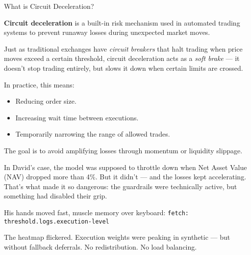 \begin{TechnicalSidebar}{What is Circuit Deceleration?}

  \textbf{Circuit deceleration} is a built-in risk mechanism used in automated trading systems to prevent runaway losses 
  during unexpected market moves.
  
  \medskip
  
  Just as traditional exchanges have \textit{circuit breakers} that halt trading when price moves exceed a certain threshold, 
  circuit deceleration acts as a \textit{soft brake} — it doesn't stop trading entirely, but slows it down when certain 
  limits are crossed.
  
  \medskip
  
  In practice, this means:

  \medskip

  \begin{itemize}
    \item Reducing order size.
    \item Increasing wait time between executions.
    \item Temporarily narrowing the range of allowed trades.
  \end{itemize}
  
  \medskip

  The goal is to avoid amplifying losses through momentum or liquidity slippage. 
  
  \medskip
  
  In David’s case, the model was supposed to throttle down when Net Asset Value (NAV) dropped more than 4\%. But it didn’t — 
  and the losses kept accelerating. That’s what made it so dangerous: the guardrails were technically active, but something 
  had disabled their grip.

\end{TechnicalSidebar}

\medskip

His hands moved fast, muscle memory over keyboard:
\texttt{fetch: threshold.logs.execution-level}

The heatmap flickered. Execution weights were peaking in synthetic — but without fallback deferrals. No redistribution.
No load balancing.

\medskip

